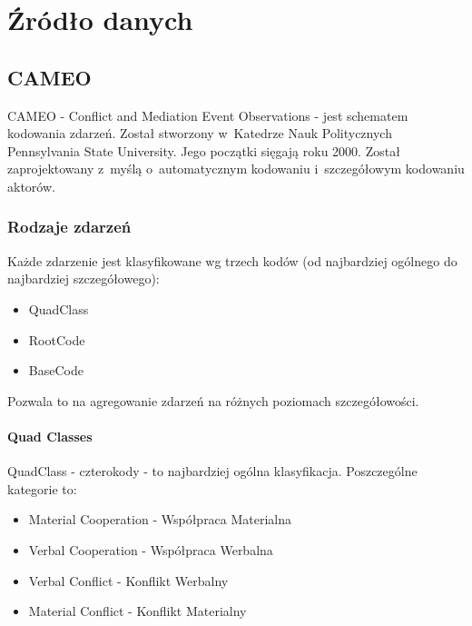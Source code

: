 \documentclass[11pt]{report}
\begin{document}
    \chapter{Źródło danych}\label{ch:źródło}


    \section{CAMEO}\label{sec:cameo}
    CAMEO - Conflict and Mediation Event Observations - jest schematem kodowania zdarzeń.
    Został stworzony w~Katedrze Nauk Politycznych Pennsylvania State University.
    Jego początki sięgają roku 2000.
    Został zaprojektowany z~myślą o~automatycznym kodowaniu i~szczegółowym kodowaniu aktorów.

    \subsection{Rodzaje zdarzeń}
    Każde zdarzenie jest klasyfikowane wg trzech kodów (od najbardziej ogólnego do najbardziej szczegółowego):
    \begin{itemize}
        \item QuadClass
        \item RootCode
        \item BaseCode
    \end{itemize}
    Pozwala to na agregowanie zdarzeń na różnych poziomach szczegółowości.

    \subsubsection{Quad Classes}
    QuadClass - czterokody - to najbardziej ogólna klasyfikacja.
    Poszczególne kategorie to:
    \begin{itemize}
        \item Material Cooperation - Współpraca Materialna
        \item Verbal Cooperation - Współpraca Werbalna
        \item Verbal Conflict - Konflikt Werbalny
        \item Material Conflict - Konflikt Materialny
    \end{itemize}
\end{document}
